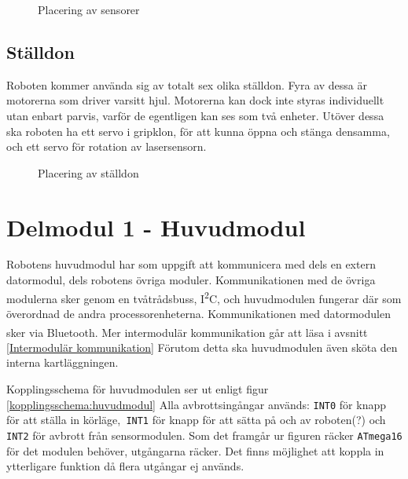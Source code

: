 \documentclass[11pt]{article}
\begin{document}
\begin{flushleft}
\begin{figure}[htbp]
\centering
\noindent\resizebox{.8\linewidth}{!}{
	}
	\caption{Placering av sensorer \label{sensor}}	
\end{figure}

\subsection{Ställdon}
Roboten kommer använda sig av totalt sex olika ställdon. Fyra av dessa är motorerna som driver varsitt hjul. Motorerna kan dock inte styras individuellt utan enbart parvis, varför de egentligen kan ses som två enheter. Utöver dessa ska roboten ha ett servo i gripklon, för att kunna öppna och stänga densamma, och ett servo för rotation av lasersensorn.
\begin{figure}[htbp]
\centering
\noindent\resizebox{.8\linewidth}{!}{
	}
	\caption{Placering av ställdon \label{ställdon}}	
\end{figure}

\clearpage
\section{Delmodul 1 - Huvudmodul}
Robotens huvudmodul har som uppgift att kommunicera med dels en extern datormodul, dels robotens övriga moduler. Kommunikationen med de övriga modulerna sker genom en tvåtrådsbuss, I\textsuperscript{2}C, och huvudmodulen fungerar där som överordnad de andra processorenheterna. Kommunikationen med datormodulen sker via  Bluetooth\textsuperscript{\circledR}. Mer intermodulär kommunikation går att läsa i avsnitt \ref{Intermodulär kommunikation} Förutom detta ska huvudmodulen även sköta den interna kartläggningen. 

Kopplingsschema för huvudmodulen ser ut enligt figur \ref{kopplingsschema:huvudmodul} Alla avbrottsingångar används: \verb+INT0+ för knapp för att ställa in körläge,\verb+ INT1+ för knapp för att sätta på och av roboten(?) och \verb+INT2+ för avbrott från sensormodulen. Som det framgår ur figuren räcker \verb+ATmega16+ för det modulen behöver, utgångarna räcker. Det finns möjlighet att koppla in ytterligare funktion då flera utgångar ej används.  


\end{flushleft}
\end{document}
